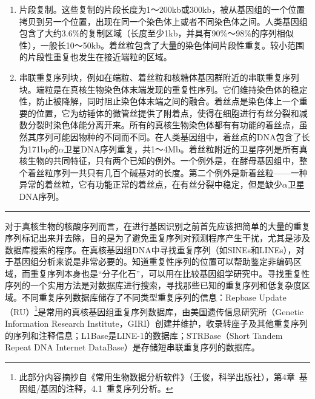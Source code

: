 \documentclass[11pt,a4paper,twoside]{book}
\begin{document}
{\begin{enumerate}
    简单重复序列是完美的或略不完美的特殊$k$-mer（$k$个碱基）的串联重复。具有短的重复单位（1～12bp）的简单序列重复称为微卫星，具有较长的重复单位的序列（13～500bp）通常称为小卫星。微卫星和小卫星占人类基因组的3\%。最常见的重复单位是二核苷酸AC、AT和AG。
  \item 片段复制。这些复制的片段长度为1～200kb或300kb，被从基因组的一个位置拷贝到另一个位置，出现在同一个染色体上或者不同染色体之间。人类基因组包含了大约3.6\%的复制区域（长度至少1kb，并具有90\%～98\%的序列相似性），一般长10～50kb。着丝粒包含了大量的染色体间片段性重复。较小范围的片段性重复也发生在接近端粒的区域。
  \item 串联重复序列块，例如在端粒、着丝粒和核糖体基因群附近的串联重复序列块。端粒是在真核生物染色体末端发现的重复性序列。它们维持染色体的稳定性，防止被降解，同时阻止染色体末端之间的融合。着丝点是染色体上一个重要的位置，它为纺锤体的微管丝提供了附着点，使得在细胞进行有丝分裂和减数分裂时染色体能分离开来。所有的真核生物染色体都有有功能的着丝点，虽然其序列可能因物种的不同而不同。在人类基因组中，着丝点的DNA包含了长为171bp的$\alpha$卫星DNA序列重复，共1～4Mb。着丝粒附近的卫星序列是所有真核生物的共同特征，只有两个已知的例外。一个例外是，在酵母基因组中，整个着丝粒序列一共只有几百个碱基对的长度。第二个例外是新着丝粒——一种异常的着丝粒，它有功能正常的着丝点，在有丝分裂中稳定，但是缺少$\alpha$卫星DNA序列。
\end{enumerate}
}

\hrule height 3pt
\vspace{0.5cm}

对于真核生物的核酸序列而言，在进行基因识别之前首先应该把简单的大量的重复序列标记出来并去除，目的是为了避免重复序列对预测程序产生干扰，尤其是涉及数据库搜索的程序。在真核基因组DNA中寻找重复序列（如SINEs和LINEs），对于基因组分析来说是非常必要的。知道重复性序列的位置可以帮助鉴定非编码区域，而重复序列本身也是“分子化石”，可以用在比较基因组学研究中。寻找重复性序列的一个实用方法是对数据库进行搜索，寻找那些已知的重复序列和低复杂度区域。不同重复序列数据库储存了不同类型重复序列的信息：Repbase Update（RU）\footnote{此部分内容摘抄自《常用生物数据分析软件》（王俊，科学出版社），第4章\ 基因组/基因的注释，4.1\ 重复序列分析。}是常用的真核基因组重复序列数据库，由美国遗传信息研究所（Genetic Information Research Institute，GIRI）创建并维护，收录转座子及其他重复序列的序列和注释信息；L1Base是LINE-1的数据库；STRBase（Short Tandem Repeat DNA Internet DataBase）是存储短串联重复序列的数据库。
\end{document}
